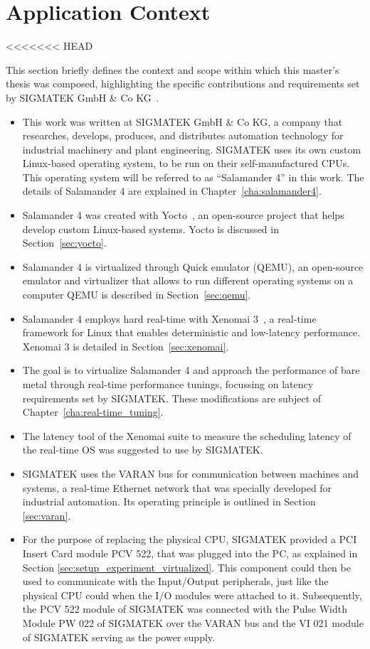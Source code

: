 \documentclass[MMR,Master,english]{twbook}
\begin{document}
\section{Application Context}\label{sec:application_context}
<<<<<<< HEAD

This section briefly defines the context and scope within which this master's thesis was composed, highlighting the specific contributions and requirements set by SIGMATEK GmbH \& Co KG~\cite{pixelartSIGMATEKKompletteAutomatisierungssysteme}.

\begin{itemize}
	\item This work was written at SIGMATEK GmbH \& Co KG, a company that researches, develops, produces, and distributes automation technology for industrial machinery and plant engineering. SIGMATEK uses its own custom Linux-based operating system, to be run on their self-manufactured CPUs. This operating system will be referred to as ``Salamander 4'' in this work. The details of Salamander 4 are explained in Chapter~\ref{cha:salamander4}. 
	\item Salamander 4 was created with Yocto~\cite{WelcomeYoctoProject}, an open-source project that helps develop custom Linux-based systems. Yocto is discussed in Section~\ref{sec:yocto}. 
	\item Salamander 4 is virtualized through Quick emulator (QEMU), an open-source emulator and virtualizer that allows to run different operating systems on a computer QEMU is described in Section~\ref{sec:qemu}.
	\item Salamander 4 employs hard real-time with Xenomai 3~\cite{XenomaiXenomai}, a real-time framework for Linux that enables deterministic and low-latency performance. Xenomai 3 is detailed in Section~\ref{sec:xenomai}. 
	\item The goal is to virtualize Salamander 4 and approach the performance of bare metal through real-time performance tunings, focussing on latency requirements set by SIGMATEK. 
	These modifications are subject of Chapter~\ref{cha:real-time_tuning}.
	\item The latency tool of the Xenomai suite to measure the scheduling latency of the real-time OS was suggested to use by SIGMATEK. 
	\item SIGMATEK uses the VARAN bus for communication between machines and systems, a real-time Ethernet network that was specially developed for industrial automation. Its operating principle is outlined in Section \ref{sec:varan}. 
	\item For the purpose of replacing the physical CPU, SIGMATEK provided a PCI Insert Card module PCV 522, that was plugged into the PC, as explained in Section \ref{sec:setup_experiment_virtualized}. This component could then be used to communicate with the Input/Output peripherals, just like the physical CPU could when the I/O modules were attached to it. Subsequently, the PCV 522 module of SIGMATEK was connected with the Pulse Width Module PW 022 of SIGMATEK over the VARAN bus and the VI 021 module of SIGMATEK serving as the power supply. 

\end{itemize}
\end{document}
